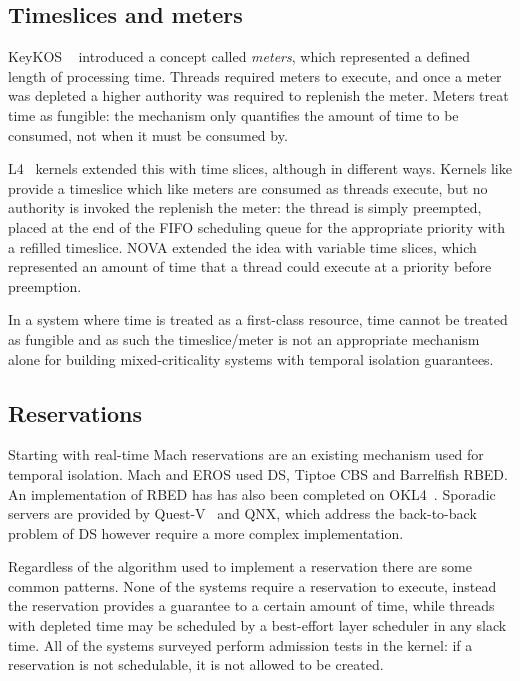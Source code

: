 \subsection{Timeslices and meters}

KeyKOS ~\citep{Bomberger_FFHLS_92} introduced a concept called \emph{meters}, which represented a
defined length of processing time. Threads required meters to execute, and once a meter was depleted
a higher authority was required to replenish the meter. Meters treat time as fungible: the mechanism
only quantifies the amount of time to be consumed, not when it must be consumed by.

L4~\citep{Elphinstone_Heiser_13} kernels extended this with time slices, although in different ways.
Kernels like \selfour provide a timeslice which like meters are consumed as threads execute, but no
authority is invoked the replenish the meter: the thread is simply preempted, placed at the end of
the \gls{FIFO} scheduling queue for the appropriate priority with a refilled timeslice. NOVA
extended the idea with variable time slices, which represented an amount of time that a thread could
execute at a priority before preemption.

In a system where time is treated as a first-class resource, time cannot be treated as fungible and
as such the timeslice/meter is not an appropriate mechanism alone for building mixed-criticality
systems with temporal isolation guarantees.

\subsection{Reservations}

Starting with real-time Mach reservations are an existing mechanism used for temporal isolation.
Mach and EROS used \gls{DS}, Tiptoe \gls{CBS} and Barrelfish \gls{RBED}. 
An implementation of RBED has has also been completed on OKL4~\citep{Petters_LHE_09}.
Sporadic servers are provided by Quest-V~\citep{Li_WCM_14} and QNX, which address the back-to-back
problem of \gls{DS} however require a more complex implementation.

Regardless of the algorithm used to implement a reservation there are some common patterns.  None of
the systems require a reservation to execute, instead the reservation provides a guarantee to a
certain amount of time, while threads with depleted time may be scheduled by a best-effort layer
scheduler in any slack time. All of the systems surveyed perform admission tests in the kernel: if a
reservation is not schedulable, it is not allowed to be created. 

